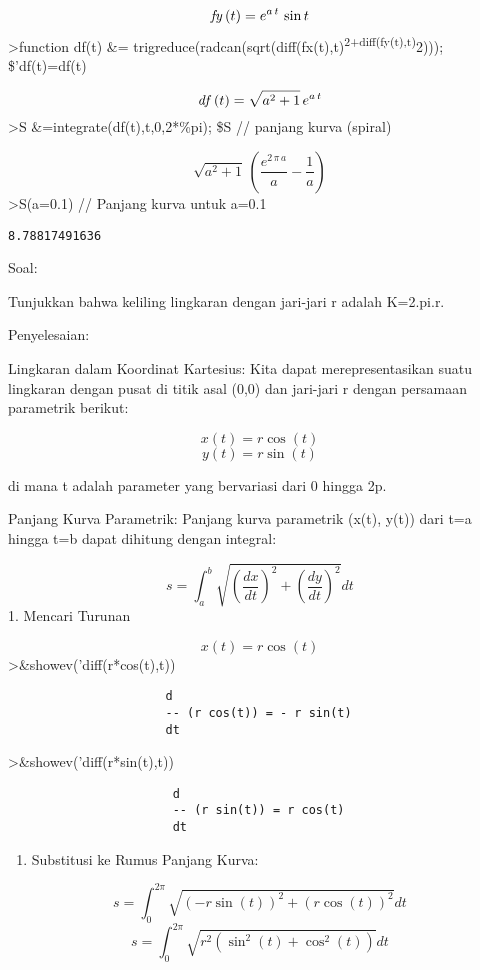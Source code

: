 \documentclass[
]{book}
\providecommand{\tightlist}{%
  \setlength{\itemsep}{0pt}\setlength{\parskip}{0pt}}
\begin{document}
\[{\it fy}\left(t\right)=e^{a\,t}\,\sin t\]\textgreater function df(t) \&= trigreduce(radcan(sqrt(diff(fx(t),t)\textsuperscript{2+diff(fy(t),t)}2))); \$'df(t)=df(t)

\[{\it df}\left(t\right)=\sqrt{a^2+1}\,e^{a\,t}\]\textgreater S \&=integrate(df(t),t,0,2*\%pi); \$S // panjang kurva (spiral)

\[\sqrt{a^2+1}\,\left(\frac{e^{2\,\pi\,a}}{a}-\frac{1}{a}\right)\]\textgreater S(a=0.1) // Panjang kurva untuk a=0.1

\begin{verbatim}
8.78817491636
\end{verbatim}

Soal:

Tunjukkan bahwa keliling lingkaran dengan jari-jari r adalah K=2.pi.r.

Penyelesaian:

Lingkaran dalam Koordinat Kartesius: Kita dapat merepresentasikan suatu lingkaran dengan pusat di titik asal (0,0) dan jari-jari r dengan persamaan parametrik berikut:

\[x(t) = r \cos(t)\]\[y(t) = r \sin(t)\]

di mana t adalah parameter yang bervariasi dari 0 hingga 2p.

Panjang Kurva Parametrik: Panjang kurva parametrik (x(t), y(t)) dari t=a hingga t=b dapat dihitung dengan integral:

\[s = \int_a^b \sqrt{\left(\frac{dx}{dt}\right)^2 + \left(\frac{dy}{dt}\right)^2} dt\]1. Mencari Turunan

\[x(t) = r \cos(t)\]\textgreater\&showev('diff(r*cos(t),t))

\begin{verbatim}
                      d
                      -- (r cos(t)) = - r sin(t)
                      dt
\end{verbatim}

\textgreater\&showev('diff(r*sin(t),t))

\begin{verbatim}
                       d
                       -- (r sin(t)) = r cos(t)
                       dt
\end{verbatim}

\begin{enumerate}
\def\labelenumi{\arabic{enumi}.}
\setcounter{enumi}{1}
\tightlist
\item
  Substitusi ke Rumus Panjang Kurva:
\end{enumerate}

\[s = \int_0^{2\pi} \sqrt{(-r \sin(t))^2 + (r \cos(t))^2} dt\]\[s = \int_0^{2\pi} \sqrt{r^2 (\sin^2(t) + \cos^2(t))} dt\]
\end{document}
